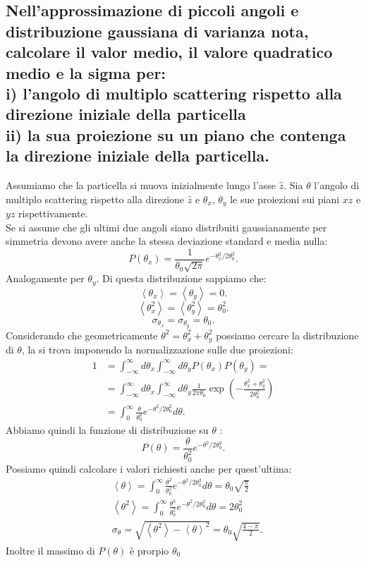 \subsection[\hspace{1mm} ]{Nell'approssimazione di piccoli angoli e distribuzione gaussiana di varianza nota, calcolare il valor medio, il valore quadratico medio e la sigma per:\\
i) l'angolo di multiplo scattering rispetto alla direzione iniziale della particella\\
ii) la sua proiezione su un piano che contenga la direzione iniziale della particella.
}
\label{sec:4.b.17}
Assumiamo che la particella si muova inizialmente lungo l'asse $\hat{z}$. Sia $\theta$ l'angolo di multiplo scattering rispetto alla direzione $\hat{z}$ e $\theta_{x}$, $\theta_{y}$ le sue proiezioni sui piani $xz$ e $yz$ rispettivamente.\\
Se si assume che gli ultimi due angoli siano distribuiti gaussianamente per simmetria devono avere anche la stessa deviazione standard e media nulla:
\[
	P\left( \theta_{x} \right) = \frac{1}{\theta_0 \sqrt{2\pi} } e^{- \theta^2_{x} / 2\theta_0^2}
.\] 
Analogamente per $\theta_{y}$. Di questa distribuzione sappiamo che:
\[
	\left<\theta_{x} \right> = \left<\theta_{y} \right> = 0
.\] 
\[
	\left<\theta_{x}^2 \right> = \left< \theta_{y}^2 \right> = \theta_0^2
.\] 
\[
	\sigma_{\theta_{x}} = \sigma_{\theta_{y}} = \theta_0
.\] 
Considerando che geometricamente $\theta^2 = \theta_{x}^2+\theta_{y}^2$ possiamo cercare la distribuzione di $\theta$, la si trova imponendo la normalizzazione sulle due proiezioni:
\begin{align*}
	1 &= \int_{-\infty}^{\infty}d\theta_{x} \int_{-\infty}^{\infty}d\theta_{y} P\left( \theta_{x} \right) P\left( \theta_{y} \right) =\\
	  &=  \int_{-\infty}^{\infty}d\theta_{x} \int_{-\infty}^{\infty}d\theta_{y}  \frac{1}{2\pi \theta_0} \exp\left( - \frac{\theta_{x}^2+\theta_{y}^2}{2\theta_0^2} \right) \\
	  &= \int_{0}^{\infty} \frac{\theta}{\theta_0^2} e^{- \theta^2 /2\theta_0^2} d\theta
.\end{align*}
Abbiamo quindi la funzione di distribuzione su $\theta$ :
\[
	P\left( \theta \right) = \frac{\theta}{\theta_0^2} e^{- \theta^2 /2\theta_0^2}
.\] 
Possiamo quindi calcolare i valori richiesti anche per quest'ultima:
\begin{align*}
	& \left<\theta \right> = \int_{0}^{\infty} \frac{\theta^2}{\theta_0^2} e^{- \theta^2 /2\theta_0^2} d\theta = \theta_0 \sqrt{\frac{\pi}{2}}\\
	& \left<\theta^2 \right> = \int_{0}^{\infty}\frac{\theta^3}{\theta_0^2} e^{- \theta^2 /2\theta_0^2} d\theta = 2 \theta_0^2 \\
	& \sigma_\theta = \sqrt{\left<\theta^2 \right>- \left< \theta \right>^2} =\theta_0 \sqrt{ \frac{4-\pi}{2}} 
.\end{align*}
Inoltre il massimo di $P\left( \theta \right)$ è prorpio $\theta_0$

